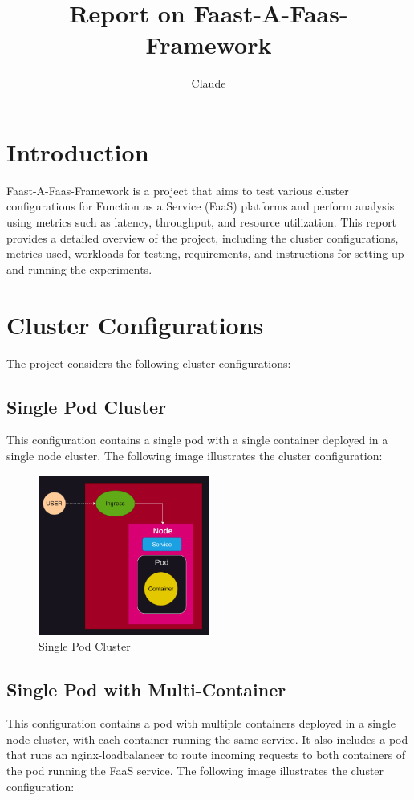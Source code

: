 \documentclass{article}
\title{Report on Faast-A-Faas-Framework}
\author{Claude}
\date{}
\begin{document}
\maketitle

\section{Introduction}
Faast-A-Faas-Framework is a project that aims to test various cluster configurations for Function as a Service (FaaS) platforms and perform analysis using metrics such as latency, throughput, and resource utilization. This report provides a detailed overview of the project, including the cluster configurations, metrics used, workloads for testing, requirements, and instructions for setting up and running the experiments.

\section{Cluster Configurations}
The project considers the following cluster configurations:

\subsection{Single Pod Cluster}
This configuration contains a single pod with a single container deployed in a single node cluster. The following image illustrates the cluster configuration:

\begin{figure}[h]
   \centering
   \includegraphics[width=0.5\textwidth]{../images/single_pod.png}
   \caption{Single Pod Cluster}
\end{figure}

\subsection{Single Pod with Multi-Container}
This configuration contains a pod with multiple containers deployed in a single node cluster, with each container running the same service. It also includes a pod that runs an nginx-loadbalancer to route incoming requests to both containers of the pod running the FaaS service. The following image illustrates the cluster configuration:
\end{document}
